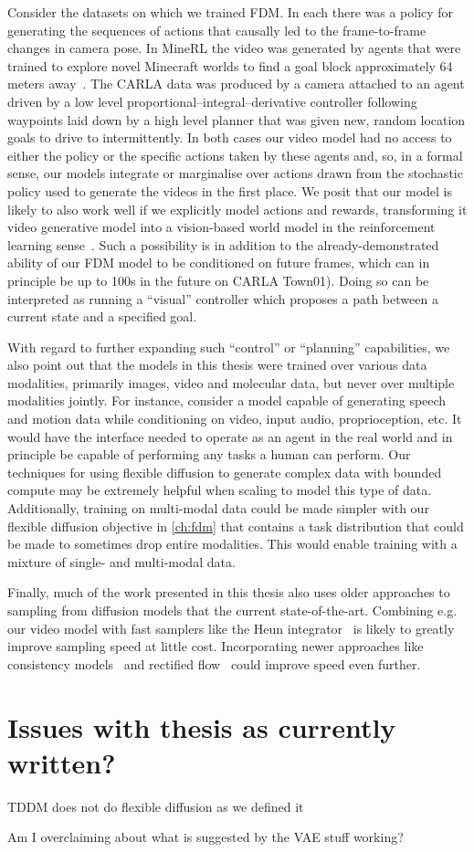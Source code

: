 Consider the datasets on which we trained FDM. In each there was a policy for generating the sequences of actions that causally led to the frame-to-frame changes in camera pose. In MineRL the video was generated by agents that were trained to explore novel Minecraft worlds to find a goal block approximately 64 meters away~\citep{saxena2021clockwork}. The CARLA data was produced by a camera attached to an agent driven by a low level proportional–integral–derivative controller following waypoints laid down by a high level planner that was given new, random location goals to
drive to intermittently. In both cases our video model had no access to either the policy or the specific actions taken by these agents and, so, in a formal sense, our models integrate or marginalise over actions drawn from the stochastic policy used to generate the videos in the first place. We posit that our model is likely to also work well if we explicitly model actions and rewards, transforming it video generative model into a vision-based world model in the reinforcement learning sense~\citep{kaiser2019model}. Such a possibility is in addition to the already-demonstrated ability of our FDM model to be conditioned on future frames, which can in principle be up to 100s in the future on CARLA Town01). Doing so can be interpreted as running a “visual” controller which proposes a path between a current state and a specified goal.

With regard to further expanding such ``control'' or ``planning'' capabilities, we also point out that the models in this thesis were trained over various data modalities, primarily images, video and molecular data, but never over multiple modalities jointly. For instance, consider a model capable of generating speech and motion data while conditioning on video, input audio, proprioception, etc. It would have the interface needed to operate as an agent in the real world and in principle be capable of performing any tasks a human can perform. Our techniques for using flexible diffusion to generate complex data with bounded compute may be extremely helpful when scaling to model this type of data. Additionally, training on multi-modal data could be made simpler with our flexible diffusion objective in \cref{ch:fdm} that contains a task distribution that could be made to sometimes drop entire modalities. This would enable training with a mixture of single- and multi-modal data.

Finally, much of the work presented in this thesis also uses older approaches to sampling from diffusion models that the current state-of-the-art. Combining e.g. our video model with fast samplers like the Heun integrator~\citep{karras2022elucidating} is likely to greatly improve sampling speed at little cost. Incorporating newer approaches like consistency models~\citep{song2023consistency} and rectified flow~\citep{esser2024scaling} could improve speed even further.


\section*{Issues with thesis as currently written?}

TDDM does not do flexible diffusion as we defined it

Am I overclaiming about what is suggested by the VAE stuff working?